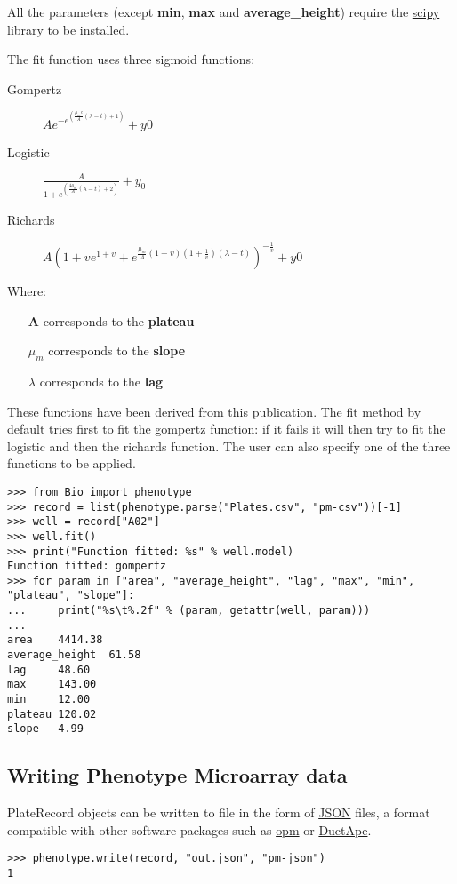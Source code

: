 All the parameters (except \textbf{min}, \textbf{max} and \textbf{average\_height}) require the
\href{https://www.scipy.org/}{scipy library} to be installed.

The fit function uses three sigmoid functions:

\begin{description}
  \item[Gompertz] $Ae^{-e^{(\frac{\mu_{m}e}{A}(\lambda - t) + 1)}} + y0$

  \item[Logistic] $\frac{A}{1+e^{(\frac{4\mu_{m}}{A}(\lambda - t) + 2)}} + y_{0}$

  \item[Richards] $A(1 + ve^{1 + v} + e^{\frac{\mu_{m}}{A}(1 + v)(1 + \frac{1}{v})(\lambda - t)})^{-\frac{1}{v}} + y0$

\end{description}

Where:
\begin{itemize}
  \item[\textbf{A}] corresponds to the \textbf{plateau}

  \item[\textbf{$\mu_{m}$}] corresponds to the \textbf{slope}

  \item[\textbf{$\lambda$}] corresponds to the \textbf{lag}

\end{itemize}

These functions have been derived from \href{https://www.ncbi.nlm.nih.gov/pubmed/16348228}{this publication}.
The fit method by default tries first to fit the gompertz function: if it fails it will then try to fit
the logistic and then the richards function. The user can also specify one of the three functions to be applied.

\begin{verbatim}
>>> from Bio import phenotype
>>> record = list(phenotype.parse("Plates.csv", "pm-csv"))[-1]
>>> well = record["A02"]
>>> well.fit()
>>> print("Function fitted: %s" % well.model)
Function fitted: gompertz
>>> for param in ["area", "average_height", "lag", "max", "min", "plateau", "slope"]:
...     print("%s\t%.2f" % (param, getattr(well, param)))
...
area    4414.38
average_height  61.58
lag     48.60
max     143.00
min     12.00
plateau 120.02
slope   4.99
\end{verbatim}

\subsection{Writing Phenotype Microarray data}
PlateRecord objects can be written to file in the form of
\href{https://en.wikipedia.org/wiki/JSON}{JSON}
files, a format compatible with other software packages such as
\href{https://www.dsmz.de/research/microorganisms/projects/analysis-of-omnilog-phenotype-microarray-data.html}{opm}
or \href{https://combogenomics.github.io/DuctApe/}{DuctApe}.
\begin{verbatim}
>>> phenotype.write(record, "out.json", "pm-json")
1
\end{verbatim}
